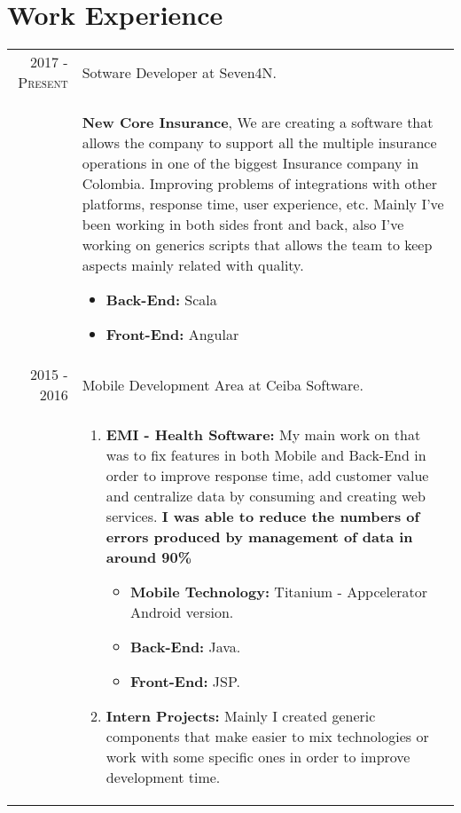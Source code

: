 \documentclass[a4paper,10pt]{article} %
\begin{document}

\section{Work Experience}

\begin{tabular}{r|p{11cm}}

\textsc{2017 - Present} & Sotware Developer at Seven4N.\\
& \footnotesize{
\textbf{New Core Insurance}, We are creating a software that allows the company to support all the multiple insurance operations in one of the biggest Insurance company in Colombia. Improving problems of integrations with other platforms, response time, user experience, etc. Mainly I've been working in both sides front and back, also I've working on generics scripts that allows the team to keep aspects mainly related with quality.
\begin{itemize}
\item \textbf{Back-End:} Scala
\item \textbf{Front-End:} Angular
\end{itemize}}\\
\textsc{2015 - 2016} & Mobile Development Area at Ceiba Software.\\
& \footnotesize{
\begin{enumerate}
\item \textbf{EMI - Health Software:} My main work on that was to fix features in both Mobile and Back-End in order to improve response time, add customer value and centralize data by consuming and creating web services. \textbf{I was able to reduce the numbers of errors produced by management of data in around 90\%}
\begin{itemize}
\item \textbf{Mobile Technology:} Titanium - Appcelerator Android version.
\item \textbf{Back-End:} Java.
\item \textbf{Front-End:} JSP.
\end{itemize}
\item \textbf{Intern Projects:} Mainly I created generic components that make easier to mix technologies or work with some specific ones in order to improve development time.
\begin{itemize}

\end{itemize}
\end{enumerate}}
\end{tabular}
\end{document}
